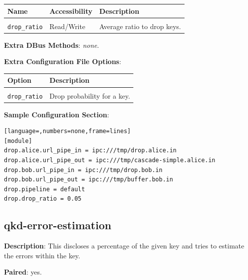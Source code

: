 \medskip

\begin{tabular}{llp{7cm}}

Name                        & Accessibility &   Description \\
\hline
\\
\texttt{drop\_ratio}        & Read/Write    &   Average ratio to drop keys. \\ [0.5em]

\end{tabular}

\bigskip

\noindent \textbf{Extra DBus Methods}: \emph{none}.

\bigskip

\noindent \textbf{Extra Configuration File Options}: 

\medskip

\begin{tabular}{lp{9cm}}

Option                      & Description \\
\hline
\\
\texttt{drop\_ratio}        & Drop probability for a key. \\ [0.5em]

\end{tabular}

\bigskip

\noindent \textbf{Sample Configuration Section}: 

\medskip

\begin{lstlisting}[language=,numbers=none,frame=lines]
[module]
drop.alice.url_pipe_in = ipc:///tmp/drop.alice.in
drop.alice.url_pipe_out = ipc:///tmp/cascade-simple.alice.in
drop.bob.url_pipe_in = ipc:///tmp/drop.bob.in
drop.bob.url_pipe_out = ipc:///tmp/buffer.bob.in
drop.pipeline = default
drop.drop_ratio = 0.05
\end{lstlisting}

\clearpage


\subsection{qkd-error-estimation}
\label{subsec:qkd-error-estimation}

\textbf{Description}: This discloses a percentage of the given key and tries to estimate the errors within the key.

\bigskip

\noindent \textbf{Paired}: yes.

